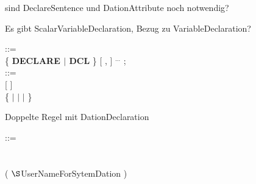 

 
















\begin{discuss}
sind DeclareSentence und DationAttribute noch notwendig?

Es gibt ScalarVariableDeclaration, Bezug zu VariableDeclaration?

 ::=\\
\x \{ {\bf DECLARE $\mid$ DCL} \}  [ ,  ] $^{...}$ ;\\

 ::=\\
\x {} [  ]\\
\x \{  $\mid$  $\mid$  $\mid$  \}\\ 
\end{discuss}


\begin{discuss}
Doppelte Regel mit DationDeclaration

 ::=\\
\x {}\\
\\
 ( $\S $UserNameForSytemDation )\\
\end{discuss}







        
